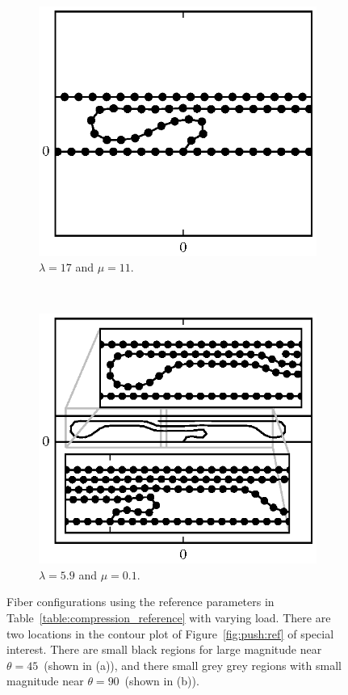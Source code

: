 	\begin{figure}[t]
		\centering
		\begin{subfigure}{.5\textwidth}
			\centering
			\includegraphics{./fig/ch3/push/ref/l17_m11.eps}
			\caption{$\lambda=17$ and $\mu=11$.\label{subfig:tight_loop}}
		\end{subfigure}%
		~
		\begin{subfigure}{.5\textwidth}
			\centering
			\includegraphics{./fig/ch3/push/ref/l5.9_m0.1.eps}
			\caption{$\lambda=5.9$ and $\mu=0.1$.\label{subfig:tight_hairpin}}
		\end{subfigure}
		\caption{Fiber configurations using the reference parameters in Table~\ref{table:compression_reference} with varying load. There are two locations in the contour plot of Figure~\ref{fig:push:ref} of special interest. There are small black regions for large magnitude near $\theta = 45$\textdegree\ (shown in (a)), and there small grey grey regions with small magnitude near $\theta = 90$\textdegree\ (shown in (b)).\label{fig:ref_special}}
	\end{figure}

